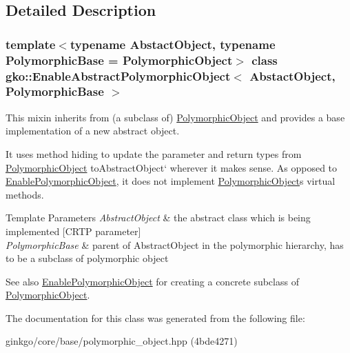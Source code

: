 \subsection{Detailed Description}
\subsubsection*{template$<$typename Abstact\+Object, typename Polymorphic\+Base = Polymorphic\+Object$>$\newline
class gko\+::\+Enable\+Abstract\+Polymorphic\+Object$<$ Abstact\+Object, Polymorphic\+Base $>$}

This mixin inherits from (a subclass of) \hyperlink{classgko_1_1PolymorphicObject}{Polymorphic\+Object} and provides a base implementation of a new abstract object. 

It uses method hiding to update the parameter and return types from {\ttfamily \hyperlink{classgko_1_1PolymorphicObject}{Polymorphic\+Object} to}Abstract\+Object` wherever it makes sense. As opposed to \hyperlink{classgko_1_1EnablePolymorphicObject}{Enable\+Polymorphic\+Object}, it does not implement \hyperlink{classgko_1_1PolymorphicObject}{Polymorphic\+Object}\textquotesingle{}s virtual methods.


\begin{DoxyTemplParams}{Template Parameters}
{\em Abstract\+Object} & the abstract class which is being implemented \mbox{[}C\+R\+TP parameter\mbox{]} \\
\hline
{\em Polymorphic\+Base} & parent of Abstract\+Object in the polymorphic hierarchy, has to be a subclass of polymorphic object\\
\hline
\end{DoxyTemplParams}
\begin{DoxySeeAlso}{See also}
\hyperlink{classgko_1_1EnablePolymorphicObject}{Enable\+Polymorphic\+Object} for creating a concrete subclass of \hyperlink{classgko_1_1PolymorphicObject}{Polymorphic\+Object}. 
\end{DoxySeeAlso}


The documentation for this class was generated from the following file\+:\begin{DoxyCompactItemize}
\item 
ginkgo/core/base/polymorphic\+\_\+object.\+hpp (4bde4271)\end{DoxyCompactItemize}
